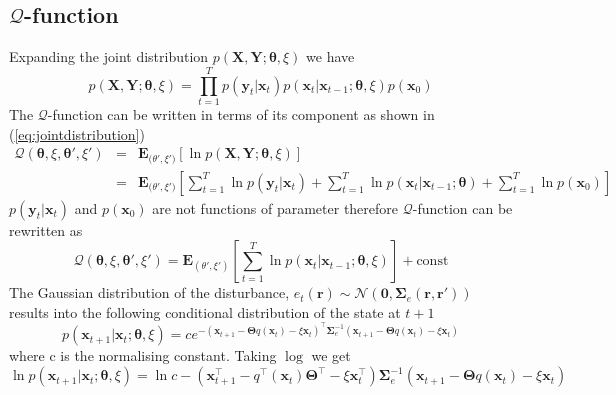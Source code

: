 \documentclass[]{article}
\begin{document}
\subsection*{$\mathcal Q$-function}
Expanding the joint distribution $p(\mathbf X,\mathbf Y;\boldsymbol \theta,\xi)$ we have
\begin{equation}
 p(\mathbf X,\mathbf Y;\boldsymbol \theta,\xi)=\prod_{t=1}^{T} p(\mathbf y_t|\mathbf x_t)p(\mathbf x_t|\mathbf x_{t-1};\boldsymbol \theta, \xi)p(\mathbf x_0)
\label{eq:jointdistribution}
\end{equation}
The $\mathcal Q$-function can be written in terms of its component as shown in (\ref{eq:jointdistribution})
\begin{eqnarray}
 \mathcal Q(\boldsymbol \theta,\xi,\boldsymbol\theta',\xi')&=&\mathbf E_{\boldsymbol (\theta',\xi')}[\ln p(\mathbf X,\mathbf Y;\boldsymbol \theta,\xi)]\nonumber\\
&=&\mathbf E_{\boldsymbol (\theta',\xi')}[\sum_{t=1}^{T}\ln p(\mathbf y_t|\mathbf x_t)+\sum_{t=1}^{T}\ln p(\mathbf x_t|\mathbf x_{t-1};\boldsymbol \theta)+\sum_{t=1}^{T}\ln p(\mathbf x_0)]
\end{eqnarray}
$p(\mathbf y_t|\mathbf x_t)$ and $p(\mathbf x_0)$ are not functions of parameter therefore $\mathcal Q$-function can be rewritten as
\begin{equation}
\mathcal Q(\boldsymbol \theta,\xi,\boldsymbol\theta',\xi')=\mathbf E_{(\theta',\xi')}[\sum_{t=1}^{T}\ln p(\mathbf x_t|\mathbf x_{t-1};\boldsymbol \theta ,\xi)]+\textrm{const}
\end{equation}
The Gaussian distribution of the disturbance, $e_t(\mathbf r)\sim \mathcal N(\mathbf 0,\boldsymbol\Sigma_e(\mathbf r,\mathbf r'))$ results into the following conditional distribution of the state at $t+1$
\begin{equation}
 p(\mathbf x_{t+1} | \mathbf x_t;\boldsymbol\theta,\xi)=ce^{-(\mathbf x_{t+1}-\boldsymbol\Theta q(\mathbf  x_t)-\xi  \mathbf x_t)^\top\boldsymbol\Sigma_e^{-1}(\mathbf x_{t+1}-\boldsymbol\Theta q( \mathbf x_t)-\xi \mathbf  x_t)}
\end{equation}
where c is the normalising constant. Taking $\log$ we get
\begin{equation}
 \ln p(\mathbf x_{t+1} |\mathbf x_t;\boldsymbol\theta,\xi)=\ln c -(\mathbf x_{t+1}^\top-q^\top(\mathbf x_t)\boldsymbol\Theta^\top -\xi  \mathbf x_t^\top)\boldsymbol\Sigma_e^{-1}(\mathbf x_{t+1}-\boldsymbol\Theta q(\mathbf x_t)-\xi \mathbf x_t)
\end{equation}
\end{document}
